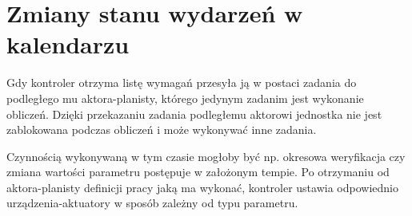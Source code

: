 \section{Zmiany stanu wydarzeń w kalendarzu}
Gdy kontroler otrzyma listę wymagań przesyła ją w postaci zadania do podległego mu aktora-planisty, którego jedynym zadanim jest wykonanie obliczeń. Dzięki przekazaniu zadania podległemu aktorowi jednostka nie jest zablokowana podczas obliczeń i może wykonywać inne zadania. 



Czynnością wykonywaną w tym czasie mogłoby być np. okresowa weryfikacja czy zmiana wartości parametru postępuje w założonym tempie.
Po otrzymaniu od aktora-planisty definicji pracy jaką ma wykonać, kontroler ustawia odpowiednio urządzenia-aktuatory w sposób zależny od typu parametru.


